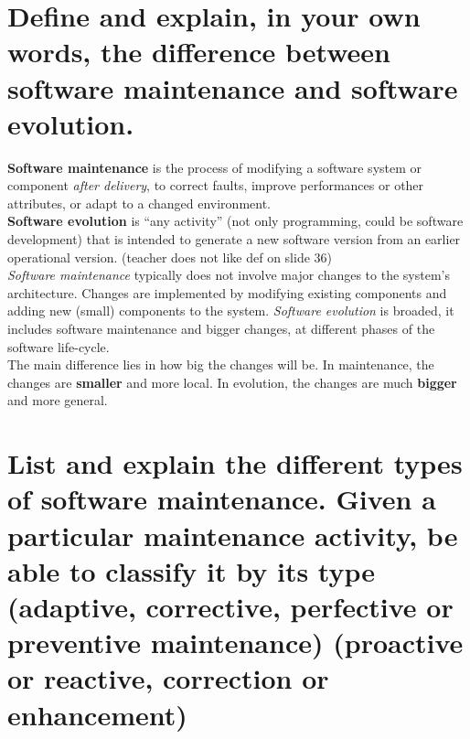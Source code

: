 \section{Define and explain, in your own words, the difference between
software maintenance and software evolution.}

\textbf{Software maintenance} is the process of modifying a software system or component \textit{after delivery}, to correct faults, improve performances or other attributes, or adapt to a changed environment. \\

\textbf{Software evolution} is \enquote{any activity} (not only programming, could be software development) that is intended to generate a new software version from an earlier operational version.  (teacher does not like def on slide 36)\\

\textit{Software maintenance} typically does not involve major changes to the system's architecture. Changes are implemented by modifying existing components and adding new (small) components to the system. \textit{Software evolution} is broaded, it includes software maintenance and bigger changes, at different phases of the software life-cycle.\\

The main difference lies in how big the changes will be. In maintenance, the changes are \textbf{smaller} and more local. In evolution, the changes are much \textbf{bigger} and more general.

\section{List and explain the different types of software maintenance.
Given a particular maintenance activity, be able to classify it by its type
(adaptive, corrective, perfective or preventive maintenance)
(proactive or reactive, correction or enhancement)}

